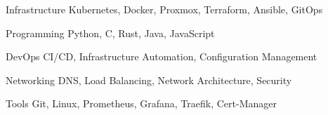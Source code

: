 \documentclass[11pt, a4paper]{awesome-cv}
\begin{document}

\begin{cvskills}

  \cvskill
    {Infrastructure}
    {Kubernetes, Docker, Proxmox, Terraform, Ansible, GitOps}

  \cvskill
    {Programming}
    {Python, C, Rust, Java, JavaScript}

  \cvskill
    {DevOps}
    {CI/CD, Infrastructure Automation, Configuration Management}

  \cvskill
    {Networking}
    {DNS, Load Balancing, Network Architecture, Security}

  \cvskill
    {Tools}
    {Git, Linux, Prometheus, Grafana, Traefik, Cert-Manager}

\end{cvskills}

\end{document}

